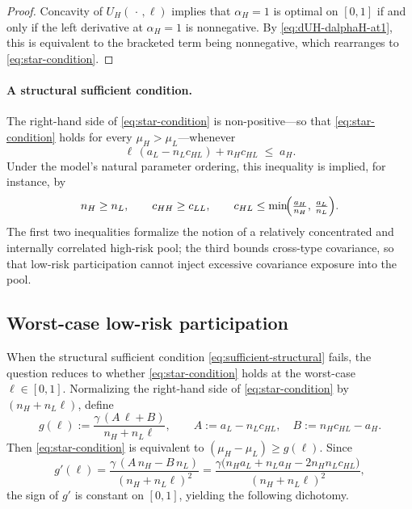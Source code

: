 \documentclass[a4paper,12pt]{article}
\theoremstyle{definition}
\theoremstyle{remark}
\newcommand{\1}{\mathbf{1}}
\begin{document}
\begin{proof}
Concavity of \(U_H(\,\cdot\,,\ell)\) implies that \(\alpha_H=1\) is optimal on
\([0,1]\) if and only if the left derivative at \(\alpha_H=1\) is nonnegative.
By \eqref{eq:dUH-dalphaH-at1}, this is equivalent to the bracketed term being
nonnegative, which rearranges to \eqref{eq:star-condition}.
\end{proof}

\paragraph{A structural sufficient condition.}
The right-hand side of \eqref{eq:star-condition} is non-positive—so that
\eqref{eq:star-condition} holds for every \(\mu_H>\mu_L\)—whenever
\begin{equation}\label{eq:sufficient-structural}
\ell\,(a_L-n_L c_{HL})+n_H c_{HL}\;\le\;a_H.
\end{equation}
Under the model's natural parameter ordering, this inequality is implied, for
instance, by
\[
n_H\ge n_L,\qquad
c_{HH}\ge c_{LL},\qquad
c_{HL}\le \min\!\Bigl(\tfrac{a_H}{n_H},\,\tfrac{a_L}{n_L}\Bigr).
\]
The first two inequalities formalize the notion of a relatively concentrated
and internally correlated high-risk pool; the third bounds cross-type
covariance, so that low-risk participation cannot inject excessive covariance
exposure into the pool.

\subsection{Worst-case low-risk participation}\label{sec:worstcase-ell}

When the structural sufficient condition \eqref{eq:sufficient-structural}
fails, the question reduces to whether \eqref{eq:star-condition} holds at the
worst-case \(\ell\in[0,1]\). Normalizing the right-hand side of
\eqref{eq:star-condition} by \((n_H+n_L\ell)\), define
\[
g(\ell)
:=
\frac{\gamma\,(A\,\ell+B)}{n_H+n_L\ell},
\qquad
A:=a_L-n_L c_{HL},
\quad
B:=n_H c_{HL}-a_H.
\]
Then \eqref{eq:star-condition} is equivalent to
\((\mu_H-\mu_L)\ge g(\ell)\). Since
\[
g'(\ell)
=\frac{\gamma\,(A\,n_H-B\,n_L)}{(n_H+n_L\ell)^{2}}
=\frac{\gamma\bigl(n_H a_L+n_L a_H-2 n_H n_L c_{HL}\bigr)}
{(n_H+n_L\ell)^{2}},
\]
the sign of \(g'\) is constant on \([0,1]\), yielding the following
dichotomy.
\end{document}
